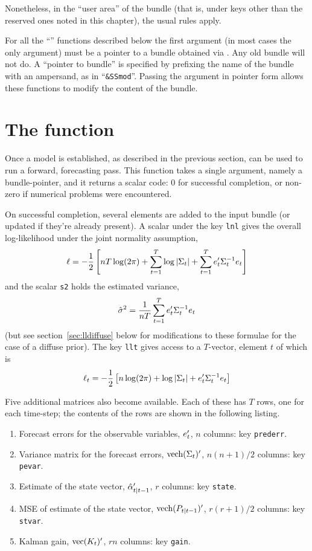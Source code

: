 \documentclass[a4paper]{article}
\begin{document}
Nonetheless, in the ``user area'' of the bundle (that is, under keys
other than the reserved ones noted in this chapter), the usual rules
apply.

For all the ``'' functions described below the first argument
(in most cases the only argument) must be a pointer to a bundle
obtained via . Any old bundle will not do. A ``pointer to
bundle'' is specified by prefixing the name of the bundle with an
ampersand, as in ``\verb|&SSmod|''. Passing the argument in pointer
form allows these functions to modify the content of the bundle.

\section{The  function}
\label{sec:kfilter}

Once a model is established, as described in the previous section,
 can be used to run a forward, forecasting pass.  This
function takes a single argument, namely a bundle-pointer, and it
returns a scalar code: 0 for successful completion, or non-zero if
numerical problems were encountered.

On successful completion, several elements are added to the input
bundle (or updated if they're already present).  A scalar under the
key \texttt{lnl} gives the overall log-likelihood under the joint
normality assumption,
%
\[
  \ell = -\frac{1}{2} \left[nT \log(2 \pi) + \sum_{t=1}^T\log \left|\Sigma_t\right| + 
    \sum_{t=1}^Te_t'\Sigma_t^{-1} e_t
  \right]
\]
%
and the scalar \texttt{s2} holds the estimated variance,
%
\[
\hat{\sigma}^2 = \frac{1}{nT} 
   \sum_{t=1}^Te_t'\Sigma_t^{-1} e_t
\]
(but see section~\ref{sec:lldiffuse} below for modifications to these
formulae for the case of a diffuse prior).  The key \texttt{llt} gives
access to a $T$-vector, element $t$ of which is
%
\[
  \ell_t = -\frac{1}{2} \left[n \log(2 \pi) + \log \left|\Sigma_t\right| + 
    e_t'\Sigma_t^{-1} e_t
  \right]
\]
%

Five additional matrices also become available.  Each of these has $T$
rows, one for each time-step; the contents of the rows are shown in
the following listing.
%
\begin{enumerate}
\item Forecast errors for the observable variables, $e_t'$, $n$
  columns: key \texttt{prederr}.
\item Variance matrix for the forecast errors, $\mbox{vech}(\Sigma_t)'$,
  $n(n+1)/2$ columns: key \texttt{pevar}.
\item Estimate of the state vector, $\hat{\alpha}_{t|t-1}'$, $r$
  columns: key \texttt{state}.
\item MSE of estimate of the state vector,
  $\mbox{vech}(P_{t|t-1})'$, $r(r+1)/2$ columns: key \texttt{stvar}.
\item Kalman gain, $\mbox{vec}(K_t)'$, $rn$ columns: key
  \texttt{gain}.
\end{enumerate}
\end{document}
